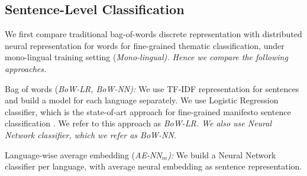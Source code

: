 \documentclass[11pt,a4paper]{article}
\newcommand{\tabref}[2][]{Table#1~\ref{#2}\xspace}
\begin{document}
\subsection{Sentence-Level Classification}
We first compare traditional bag-of-words discrete representation with distributed neural representation for words for fine-grained thematic classification, under mono-lingual training setting (\em{Mono-lingual}). \rm Hence we compare the following approaches. 

\begin{description}
\item{Bag of words (\em{BoW-LR}, \em{BoW-NN}):} We use TF-IDF representation for sentences and build a model for each language separately. We use Logistic Regression classifier, which is the state-of-art approach for fine-grained manifesto sentence classification \cite{biessmann2016automating}. We refer to this approach as \em{BoW-LR}. \rm We also use Neural Network classifier, which we refer as \em{BoW-NN}. \rm

\item{Language-wise average embedding (\em{AE-NN$_{m}$}):} \rm We build a Neural Network classifier per language, with average neural embedding as sentence representation.
\end{description}


\end{document}
